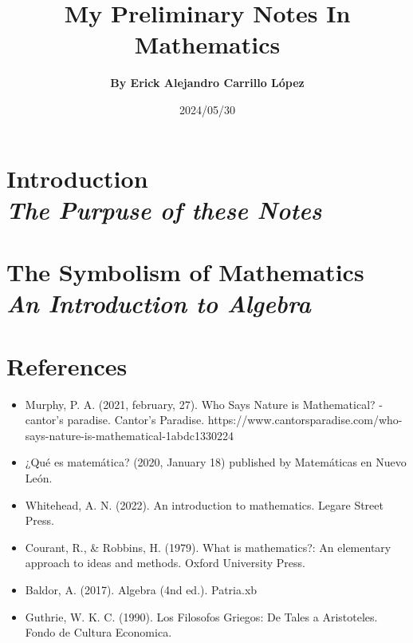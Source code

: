 \documentclass[12pt]{book}
\title{\textbf{My Preliminary Notes In Mathematics}}
\author{\textbf{By Erick Alejandro Carrillo López}}
\date{2024/05/30}
\newcommand\Chapter[2]{
  \chapter[#1: {\itshape#2}]{#1\\[2ex]\Large\itshape#2}
}
\begin{document}
\maketitle

\tableofcontents
{}

\Chapter{Introduction}{The Purpuse of these Notes}


\Chapter{The Symbolism of Mathematics}{An Introduction to Algebra}


\chapter{References}
\begin{itemize}
\item Murphy, P. A. (2021, february, 27). Who Says Nature is Mathematical? - cantor’s paradise. Cantor’s Paradise. https://www.cantorsparadise.com/who-says-nature-is-mathematical-1abdc1330224
\item ¿Qué es matemática? (2020, January 18) published by Matemáticas en Nuevo León.
\item Whitehead, A. N. (2022). An introduction to mathematics. Legare Street Press.
\item Courant, R., \& Robbins, H. (1979). What is mathematics?: An elementary approach to ideas and methods.
  Oxford University Press.
\item Baldor, A. (2017). Algebra (4nd ed.). Patria.xb
\item Guthrie, W. K. C. (1990). Los Filosofos Griegos: De Tales a Aristoteles. Fondo de Cultura Economica.
\end{itemize}
\end{document}
